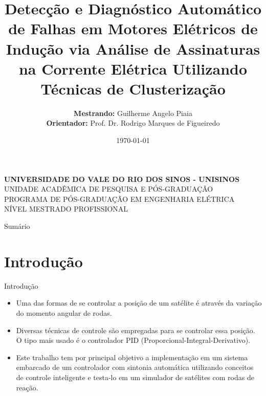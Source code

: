 \documentclass[aspectratio=169]{beamer}
\title[ Detecção e Diagnóstico Automático de Falhas em Motores Elétricos de Indução via Análise de Assinaturas na
Corrente Elétrica Utilizando ...]
{Detecção e Diagnóstico Automático de Falhas em Motores Elétricos de Indução via Análise de Assinaturas na
Corrente Elétrica Utilizando Técnicas de Clusterização}
\author[Piaia, G. A.]{
	{\fontsize{10}{8}\selectfont \textbf{Mestrando:} Guilherme Angelo Piaia} \\
	{\fontsize{10}{8}\selectfont \textbf{Orientador:} Prof. Dr. Rodrigo Marques de Figueiredo}
}
\date{\today}
\begin{document}

\begin{frame}
	\begin{minipage}{1\linewidth}
		\centering
		    \textbf{UNIVERSIDADE DO VALE DO RIO DOS SINOS - UNISINOS} \\ UNIDADE ACADÊMICA DE PESQUISA E PÓS-GRADUAÇÃO \\ PROGRAMA DE PÓS-GRADUAÇÃO EM ENGENHARIA ELÉTRICA \\ NÍVEL MESTRADO PROFISSIONAL
	\end{minipage}
	\titlepage
\end{frame}


\begin{frame}{Sumário}
	\tableofcontents
\end{frame}


\section{Introdução}
\begin{frame}{Introdução}
	\begin{itemize}
		\justifying
		\item Uma das formas de se controlar a posição de um satélite é através da variação do momento angular de rodas.
		\item Diversas técnicas de controle são empregadas para se controlar essa posição. O tipo mais usado é o controlador PID  (Proporcional-Integral-Derivativo).
		\item Este trabalho tem por principal objetivo a implementação em um sistema embarcado
de um controlador com sintonia automática utilizando conceitos de controle inteligente e testa-lo em um simulador de satélites com rodas de reação.
    \end{itemize}
\end{frame}

\end{document}
